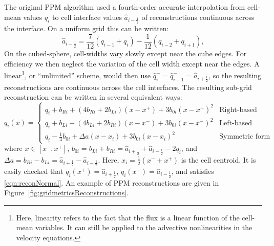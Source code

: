 \documentclass[10pt,letterpaper,margin=1in]{memoir}
\newcommand{\half}{\frac{1}{2}}
\begin{document}
The original \citet{CW84} PPM algorithm used a fourth-order accurate interpolation from cell-mean values $q_i$ to cell interface values $\widehat{a}_{i-\half}$ of reconstructions continuous across the interface. On a uniform grid this can be written:
\begin{equation}
\widehat{a}_{i-\half} = \frac{7}{12} \left (q_{i-1} + q_{i} \right ) - \frac{1}{12} \left ( q_{i-2} + q_{i+1} \right ), \label{eqn:PPMinterp}
\end{equation}
On the cubed-sphere, cell-widths vary slowly except near the cube edges. For efficiency we then neglect the variation of the cell width except near the edges. A linear\footnote{Here, linearity refers to the fact that the flux is a linear function of the cell-mean variables. It can still be applied to the advective nonlinearities in the velocity equations. }, or ``unlimited'' scheme, would then use $\widehat{q}_{i}^+ = \widehat{q}_{i+1}^- = \widehat{a}_{i+\half}$, so the resulting reconstructions are continuous across the cell interfaces. The resulting sub-grid reconstruction can be written in several equivalent ways:
\begin{equation} \label{eqn:PPMreconstructions}
q_i(x) = 
\begin{cases} 
q_i + b_{Ri} + \left ( 4b_{Ri} + 2b_{Li} \right ) \left (x - x^+ \right ) + 3 b_{0i}  \left (x - x^+ \right)^2  
 & \text{Right-based} \\
q_i + b_{Li} - \left ( 4b_{Li} + 2b_{Ri} \right ) \left (x - x^- \right ) + 3 b_{0i}  \left (x - x^- \right)^2  
 & \text{Left-based} \\
q_i - \frac{1}{4} b_{0i} + \Delta a \left (x - x_{i} \right ) + 3b_{0i}  \left (x - x_{i} \right)^2  
 & \text{Symmetric form}
\end{cases}
\end{equation}
where $x \in \left [x^-, x^+ \right ]$, $b_{0i} = b_{Li} + b_{Ri} = \widehat{a}_{i+\half} + \widehat{a}_{i-\half} - 2q_i$, and $\Delta a = b_{Ri} - b_{Li} = \widehat{a}_{i+\half} - \widehat{a}_{i-\half}$. Here, $x_i = \half \left (x^- + x^+\right )$ is the cell centroid.
It is easily checked that $q_i\left(x^+\right) = \widehat{a}_{i+\half}$, $q_i\left(x^-\right) = \widehat{a}_{i-\half}$, and satisfies \eqref{eqn:reconNormal}. An example of PPM reconstructions are given in Figure~\ref{fig:gridmetricsReconstructions}.
\end{document}
